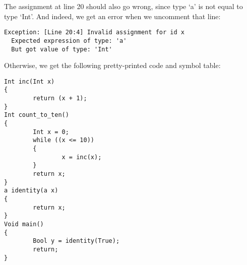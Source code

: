\documentclass[a4paper]{article}
\begin{document}
The assignment at line 20 should also go wrong, since type `a' is not equal to type `Int'. And indeed, we get an error when we uncomment that line: 
\begin{verbatim}
Exception: [Line 20:4] Invalid assignment for id x
  Expected expression of type: 'a'
  But got value of type: 'Int'
\end{verbatim}

Otherwise, we get the following pretty-printed code and symbol table: 
\begin{verbatim}
Int inc(Int x)
{
        return (x + 1);
}
Int count_to_ten()
{
        Int x = 0;
        while ((x <= 10))
        {
                x = inc(x);
        }
        return x;
}
a identity(a x)
{
        return x;
}
Void main()
{
        Bool y = identity(True);
        return;
}


\end{verbatim}
\end{document}
